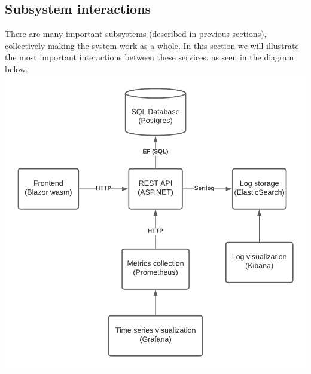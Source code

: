   \subsection{Subsystem interactions}
  There are many important subsystems (described in previous sections), collectively making the system work as a whole.
  In this section we will illustrate the most important interactions between these services, as seen in the diagram below.\newline
  \includegraphics{images/InteractionDiagram.png}
